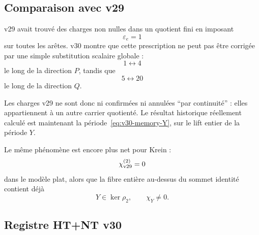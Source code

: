 \documentclass[11pt,a4paper]{article}
\begin{document}
\subsection{Comparaison avec v29}

v29 avait trouvé des charges non nulles dans un quotient fini en imposant
\[
 \varepsilon_e=1
\]
sur toutes les arêtes. v30 montre que cette prescription ne peut pas être corrigée par une simple substitution scalaire globale :
\[
 1\leftrightarrow4
\]
le long de la direction $P$, tandis que
\[
 5\leftrightarrow20
\]
le long de la direction $Q$.

Les charges v29 ne sont donc ni confirmées ni annulées ``par continuité'' : elles appartiennent à un autre carrier quotienté. Le résultat historique réellement calculé est maintenant la période~\eqref{eq:v30-memory-Y}, sur le lift entier de la période $Y$.

Le même phénomène est encore plus net pour Krein :
\[
 \chi^{(2)}_{\rm v29}=0
\]
dans le modèle plat, alors que la fibre entière au-dessus du sommet identité contient déjà
\[
 \boxed{
 Y\in\ker\rho_2,
 \qquad
 \chi_Y\neq0.}
\]

\subsection{Registre HT+NT v30}
\end{document}
